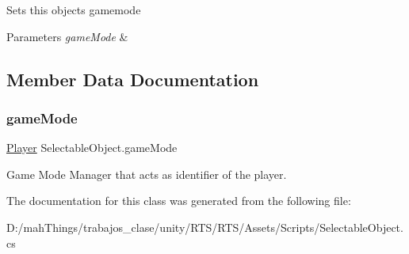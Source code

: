 Sets this objects gamemode 


\begin{DoxyParams}{Parameters}
{\em game\+Mode} & \\
\hline
\end{DoxyParams}


\subsection{Member Data Documentation}
\mbox{\label{class_selectable_object_ae127d54f7f6ac4f1655b1fa3f4dd480f}} 
\subsubsection{\texorpdfstring{game\+Mode}{gameMode}}
{\footnotesize\ttfamily \mbox{\hyperlink{class_player}{Player}} Selectable\+Object.\+game\+Mode\hspace{0.3cm}{\ttfamily [protected]}}



Game Mode Manager that acts as identifier of the player. 



The documentation for this class was generated from the following file\+:\begin{DoxyCompactItemize}
\item 
D\+:/mah\+Things/trabajos\+\_\+clase/unity/\+R\+T\+S/\+R\+T\+S/\+Assets/\+Scripts/Selectable\+Object.\+cs\end{DoxyCompactItemize}
